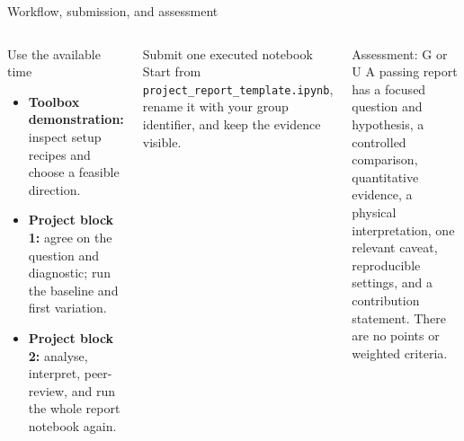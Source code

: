 \documentclass[aspectratio=169]{beamer}
\begin{document}
\begin{frame}{Workflow, submission, and assessment}
  \begin{columns}[T]
      \begin{block}{Use the available time}
        \begin{itemize}
          \item \textbf{Toolbox demonstration:} inspect setup recipes and choose
                a feasible direction.
          \item \textbf{Project block 1:} agree on the question and diagnostic;
                run the baseline and first variation.
          \item \textbf{Project block 2:} analyse, interpret, peer-review, and
                run the whole report notebook again.
        \end{itemize}
      \end{block}
      \begin{block}{Submit one executed notebook}
        Start from \texttt{project\_report\_template.ipynb}, rename it
        with your group identifier, and keep the evidence visible.
      \end{block}
      \begin{alertblock}{Assessment: G or U}
        A passing report has a focused question and hypothesis, a controlled
        comparison, quantitative evidence, a physical interpretation, one
        relevant caveat, reproducible settings, and a contribution statement.
        There are no points or weighted criteria.
      \end{alertblock}
  \end{columns}
\end{frame}
\end{document}
